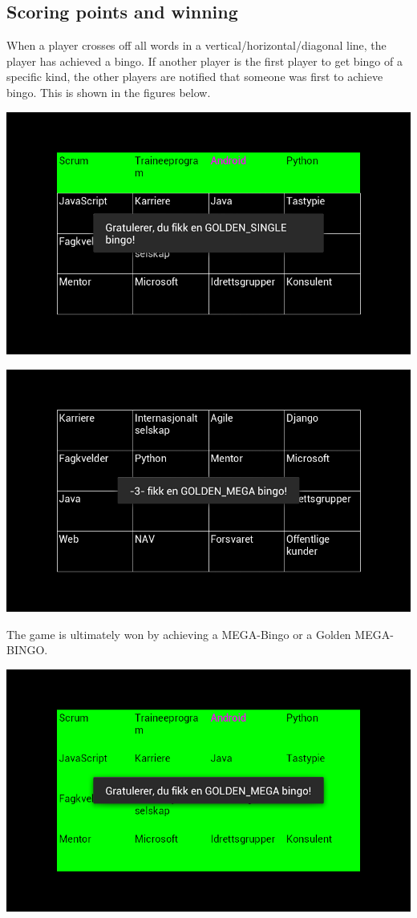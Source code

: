 \subsection{Scoring points and winning}
When a player crosses off all words in a vertical/horizontal/diagonal line, the player has achieved a bingo. If another player is the first player to get bingo of a specific kind, the other players are notified that someone was first to achieve bingo. This is shown in the figures below.

\begin{center}
\includegraphics[scale=0.5]{Pikks/GoldenSingle}
\end{center}

\begin{center}
\includegraphics[scale=0.5]{Pikks/Notificationfromserver}
\end{center}


The game is ultimately won by achieving a MEGA-Bingo or a Golden MEGA-BINGO. 

\begin{center}
\includegraphics[scale=0.5]{Pikks/GoldenMega}
\end{center}